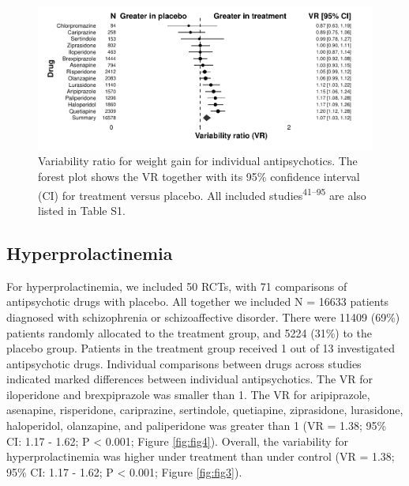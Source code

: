 \documentclass[
  9pt,
  english,
  ,jou,floatsintext]{apa6}
\begin{document}
\begin{figure}
\centering
\includegraphics{../output/figures/weightsd_fig2.pdf}
\caption{\label{fig:fig2}Variability ratio for weight gain for individual
antipsychotics. The forest plot shows the VR together with its 95\%
confidence interval (CI) for treatment versus placebo. All included studies\textsuperscript{41--95}
are also listed in Table S1.}
\end{figure}

\hypertarget{hyperprolactinemia}{%
\subsection{Hyperprolactinemia}\label{hyperprolactinemia}}

For hyperprolactinemia, we included 50 RCTs, with 71
comparisons of antipsychotic drugs with placebo. All together we
included N = 16633 patients diagnosed with schizophrenia or
schizoaffective disorder. There were 11409
(69\%) patients randomly allocated to
the treatment group, and 5224
(31\%) to the placebo group. Patients
in the treatment group received 1 out of 13 investigated antipsychotic
drugs. Individual comparisons between drugs across studies indicated
marked differences between individual antipsychotics. The VR for
iloperidone and brexpiprazole was smaller than 1. The VR for aripiprazole,
asenapine, risperidone, cariprazine, sertindole, quetiapine, ziprasidone,
lurasidone, haloperidol, olanzapine, and paliperidone was greater than 1
(VR = 1.38; 95\% CI: 1.17 - 1.62; P \textless{} 0.001; Figure \ref{fig:fig4}).
Overall, the variability for hyperprolactinemia was higher under treatment
than under control (VR = 1.38; 95\% CI: 1.17 - 1.62; P \textless{} 0.001; Figure \ref{fig:fig3}).
\end{document}
